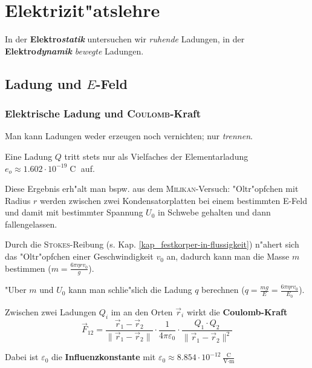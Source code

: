 \chapter{Elektrizit"atslehre}
\label{kap_elektrizitatslehre}



In der \textbf{Elektro\emph{statik}} untersuchen wir \emph{ruhende}
Ladungen, in der \textbf{Elektro\emph{dynamik}} \emph{bewegte}
Ladungen.




\section{Ladung und $E$-Feld}
\label{kap_ladung-und-e-feld}



\subsection{Elektrische Ladung und \textsc{Coulomb}-Kraft}
\label{kap_elektrische-ladung-und-}


\begin{Wichtig}
   Man kann Ladungen weder erzeugen noch vernichten; nur \emph{trennen}.
\end{Wichtig}
Eine Ladung $Q$ tritt stets nur als Vielfaches der Elementarladung
$e_o \approx 1.602 \cdot 10^{-19}\operatorname{C}$ auf.

Diese Ergebnis erh"alt man bspw. aus dem
\textsc{Milikan}-Versuch: "Oltr"opfchen mit Radius $r$
werden zwischen zwei Kondensatorplatten bei einem bestimmten E-Feld
und damit mit bestimmter Spannung $U_0$ in Schwebe gehalten und dann
fallengelassen.

Durch die \textsc{Stokes}-Reibung
(s. Kap. \ref{kap_festkorper-in-flussigkeit}) n"ahert sich das
"Oltr"opfchen einer Geschwindigkeit $v_0$ an, dadurch kann man die Masse
$m$ bestimmen ($m = \frac{6\pi\eta r v_0}{g}$).

"Uber $m$ und $U_0$ kann man schlie"slich die Ladung $q$ berechnen ($q =
\frac{mg}{E} = \frac{6\pi\eta r v_0}{E_0}$).


\bigskip


\begin{Wichtig}
Zwischen zwei Ladungen $Q_i$ im an den Orten $\vec r_i$ wirkt die  \textbf{\textbf{Coulomb}-Kraft}
\begin{equation}
   \label{eqn_coulomb}
\boxed{
   \vec F_{12} = \frac{\vec r_1 - \vec r_2}{\|\vec r_1 - \vec r_2\|}
   \cdot \frac{1}{4 \pi \varepsilon_0} \cdot \frac{Q_1
     \cdot Q_2}{\|\vec r_1 - \vec r_2\|^2}
}
\end{equation}
\end{Wichtig}
Dabei ist $\varepsilon_0$ die
\textbf{Influenzkonstante} mit $\varepsilon_0
\approx 8.854 \cdot
10^{-12}\frac{\operatorname{C}}{\operatorname{V\cdot m}}$



